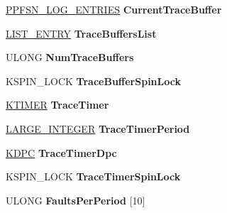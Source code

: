 \begin{DoxyCompactItemize}
\hyperlink{struct___p_f_s_n___l_o_g___e_n_t_r_i_e_s}{P\+P\+F\+S\+N\+\_\+\+L\+O\+G\+\_\+\+E\+N\+T\+R\+I\+ES} {\bfseries Current\+Trace\+Buffer}
\item 
\mbox{\label{struct___p_f_s_n___t_r_a_c_e___h_e_a_d_e_r_afb78af9bfb06ab8d539d7fe64c54b859}} 
\hyperlink{struct___l_i_s_t___e_n_t_r_y}{L\+I\+S\+T\+\_\+\+E\+N\+T\+RY} {\bfseries Trace\+Buffers\+List}
\item 
\mbox{\label{struct___p_f_s_n___t_r_a_c_e___h_e_a_d_e_r_a04f56e1ab04ca01759fdfc1a1bcc3783}} 
U\+L\+O\+NG {\bfseries Num\+Trace\+Buffers}
\item 
\mbox{\label{struct___p_f_s_n___t_r_a_c_e___h_e_a_d_e_r_aff810b0170365f252ab3923c9a0f6569}} 
K\+S\+P\+I\+N\+\_\+\+L\+O\+CK {\bfseries Trace\+Buffer\+Spin\+Lock}
\item 
\mbox{\label{struct___p_f_s_n___t_r_a_c_e___h_e_a_d_e_r_a01cb305468be4b0f325dbcf3e7587370}} 
\hyperlink{struct___k_t_i_m_e_r}{K\+T\+I\+M\+ER} {\bfseries Trace\+Timer}
\item 
\mbox{\label{struct___p_f_s_n___t_r_a_c_e___h_e_a_d_e_r_a1664a7acabc84e3b26f64732aa046007}} 
\hyperlink{union___l_a_r_g_e___i_n_t_e_g_e_r}{L\+A\+R\+G\+E\+\_\+\+I\+N\+T\+E\+G\+ER} {\bfseries Trace\+Timer\+Period}
\item 
\mbox{\label{struct___p_f_s_n___t_r_a_c_e___h_e_a_d_e_r_a99276d417e9c90446728329d2258eb64}} 
\hyperlink{struct___k_d_p_c}{K\+D\+PC} {\bfseries Trace\+Timer\+Dpc}
\item 
\mbox{\label{struct___p_f_s_n___t_r_a_c_e___h_e_a_d_e_r_ad6cb74b58eedacd92a0b55a4f351e8b4}} 
K\+S\+P\+I\+N\+\_\+\+L\+O\+CK {\bfseries Trace\+Timer\+Spin\+Lock}
\item 
\mbox{\label{struct___p_f_s_n___t_r_a_c_e___h_e_a_d_e_r_a177e4bdb47f53bfd89fafffeec25c5ee}} 
U\+L\+O\+NG {\bfseries Faults\+Per\+Period} \mbox{[}10\mbox{]}
\item 

\end{DoxyCompactItemize}
